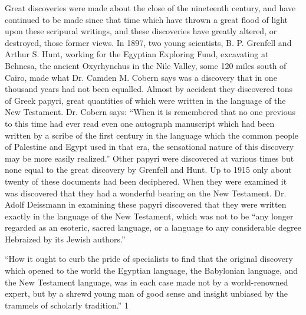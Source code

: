 Great discoveries were made about the close of the nineteenth century, and have continued to
be made since that time which have thrown a great flood of light upon these scripural
writings, and these discoveries have greatly altered, or destroyed, those former views. In
1897, two young scientists, B. P. Grenfell and Arthur S. Hunt, working for the Egyptian
Exploring Fund, excavating at Behnesa, the ancient Oxyrhynchus in the Nile Valley, some
120 miles south of Cairo, made what Dr. Camden M. Cobern says was a discovery that in
one thousand years had not been equalled. Almost by accident they discovered tons of Greek
papyri, great quantities of which were written in the language of the New Testament. Dr.
Cobern says: ``When it is remembered that no one previous to this time had ever read even
one autograph manuscript which had been written by a scribe of the first century in the
language which the common people of Palestine and Egypt used in that era, the sensational
nature of this discovery may be more easily realized.'' Other papyri were discovered at
various times but none equal to the great discovery by Grenfell and Hunt. Up to 1915 only
about twenty of these documents had been deciphered. When they were examined it was
discovered that they had a wonderful bearing on the New Testament. Dr. Adolf Deissmann in
examining these papyri discovered that they were written exactly in the language of the New
Testament, which was not to be ``any longer regarded as an esoteric, sacred language, or a
language to any considerable degree Hebraized by its Jewish authors.''

``How it ought to curb the pride of specialists to find that the original discovery which opened
to the world the Egyptian language, the Babylonian language, and the New Testament
language, was in each case made not by a world-renowned expert, but by a shrewd young
man of good sense and insight unbiased by the trammels of scholarly tradition.'' 1

